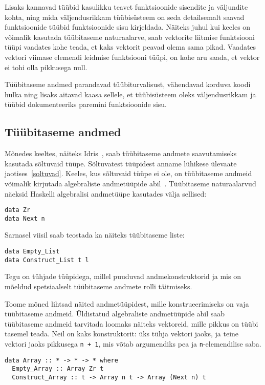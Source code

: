 \documentclass[12pt]{article}
\begin{document}
    Lisaks kannavad tüübid kasulikku teavet funktsioonide sisendite ja väljundite kohta, ning mida väljendusrikkam tüübisüsteem on seda detailsemalt saavad funktsioonide tüübid funktsioonide sisu kirjeldada. Näiteks juhul kui keeles on võimalik kasutada tüübitaseme naturaalarve, saab vektorite liitmise funktsiooni tüüpi vaadates kohe teada, et kaks vektorit peavad olema sama pikad. Vaadates vektori viimase elemendi leidmise funktsiooni tüüpi, on kohe aru saada, et vektor ei tohi olla pikkusega null.

    Tüübitaseme andmed parandavad tüübiturvalisust, vähendavad korduva koodi hulka ning lisaks aitavad kaasa sellele, et tüübisüsteem oleks väljendusrikkam ja tüübid dokumenteeriks paremini funktsioonide sisu.
    \subsection{Tüübitaseme andmed}\label{tyybitasemeandmed}
      Mõnedes keeltes, näiteks Idris~\cite{The_Idr}, saab tüübitaseme andmete saavutamiseks kasutada sõltuvaid tüüpe. Sõltuvatest tüüpidest anname lühikese ülevaate jaotises~\ref{soltuvad}. Keeles, kus sõltuvaid tüüpe ei ole, on tüübitaseme andmeid võimalik kirjutada algebraliste andmetüüpide abil~\cite{Giv}. Tüübitaseme naturaalarvud näeksid Haskelli algebralisi andmetüüpe kasutades välja sellised:

      \begin{verbatim}data Zr
data Next n\end{verbatim}

      Sarnasel viisil saab teostada ka näiteks tüübitaseme liste:

      \begin{verbatim}data Empty_List
data Construct_List t l\end{verbatim}

      Tegu on tühjade tüüpidega, millel puuduvad andmekonstruktorid ja mis on mõeldud spetsiaalselt tüübitaseme andmete rolli täitmiseks.

      Toome mõned lihtsad näited andmetüüpidest, mille konstrueerimiseks on vaja tüübitaseme andmeid. Üldistatud algebraliste andmetüüpide abil saab tüübitaseme andmeid tarvitada loomaks näiteks vektoreid, mille pikkus on tüübi tasemel teada. Neil on kaks konstruktorit: üks tühja vektori jaoks, ja teine vektori jaoks pikkusega \verb!n + 1!, mis võtab argumendiks pea ja \verb!n!-elemendilise saba.

      \begin{verbatim}data Array :: * -> * -> * where
  Empty_Array :: Array Zr t
  Construct_Array :: t -> Array n t -> Array (Next n) t\end{verbatim}
\end{document}
